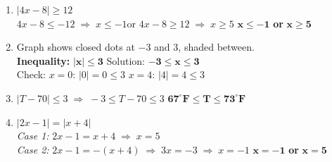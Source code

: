 \documentclass[11pt]{article}
\begin{document}
\begin{tcolorbox}[anskey, title={Section D \textemdash\ Mixed \& Word Problems}]
\begin{enumerate}[leftmargin=1.8em, itemsep=6pt, start=17]
  \item $|4x-8|\geq 12$\\
        $4x-8\leq -12 \;\Rightarrow\; x\leq -1$\quad or\quad
        $4x-8\geq 12 \;\Rightarrow\; x\geq 5$\hfill
        $\boldsymbol{x\leq -1}$ \textbf{ or } $\boldsymbol{x\geq 5}$

  \item Graph shows closed dots at $-3$ and $3$, shaded between.\\
        \textbf{Inequality:} $\boldsymbol{|x|\leq 3}$\quad
        Solution: $\boldsymbol{-3\leq x\leq 3}$\\
        Check: $x=0$: $|0|=0\leq 3$ \checkmark\quad
               $x=4$: $|4|=4\leq 3$ \texttimes\

  \item $|T-70|\leq 3 \;\Rightarrow\; -3\leq T-70\leq 3$\hfill
        $\boldsymbol{67^\circ\text{F}\leq T\leq 73^\circ\text{F}}$

  \item $|2x-1|=|x+4|$\\
        \textit{Case 1:} $2x-1=x+4 \;\Rightarrow\; x=5$\\
        \textit{Case 2:} $2x-1=-(x+4) \;\Rightarrow\; 3x=-3 \;\Rightarrow\; x=-1$\hfill
        $\boldsymbol{x=-1}$ \textbf{ or } $\boldsymbol{x=5}$
\end{enumerate}
\end{tcolorbox}
\end{document}

